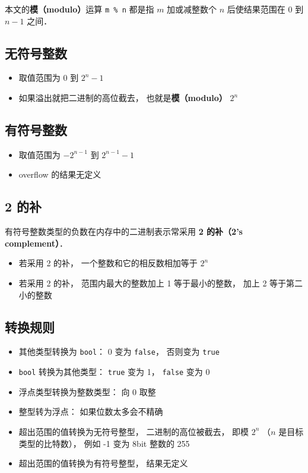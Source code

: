 
本文的\textbf{模（modulo）}运算 \verb|m % n| 都是指 $m$ 加或减整数个 $n$ 后使结果范围在 $0$ 到 $n-1$ 之间．

\subsection{无符号整数}
\begin{itemize}
\item 取值范围为 $0$ 到 $2^n-1$
\item 如果溢出就把二进制的高位截去， 也就是\textbf{模（modulo）} $2^n$
\end{itemize}

\subsection{有符号整数}
\begin{itemize}
\item 取值范围为 $-2^{n-1}$ 到 $2^{n-1}-1$
\item overflow 的结果无定义
\end{itemize}

\subsection{2 的补}
有符号整数类型的负数在内存中的二进制表示常采用 \textbf{2 的补（2's complement）}．
\begin{itemize}
\item 若采用 2 的补， 一个整数和它的相反数相加等于 $2^n$
\item 若采用 2 的补， 范围内最大的整数加上 1 等于最小的整数， 加上 2 等于第二小的整数
\end{itemize}

\subsection{转换规则}
\begin{itemize}
\item 其他类型转换为 \verb|bool|： 0 变为 \verb|false|， 否则变为 \verb|true|
\item \verb|bool| 转换为其他类型： \verb|true| 变为 1， \verb|false| 变为 0
\item 浮点类型转换为整数类型： 向 0 取整
\item 整型转为浮点： 如果位数太多会不精确
\item 超出范围的值转换为无符号整型， 二进制的高位被截去， 即模 $2^n$ （$n$ 是目标类型的比特数）， 例如 -1 变为 8bit 整数的 255
\item 超出范围的值转换为有符号整型， 结果无定义
\end{itemize}

